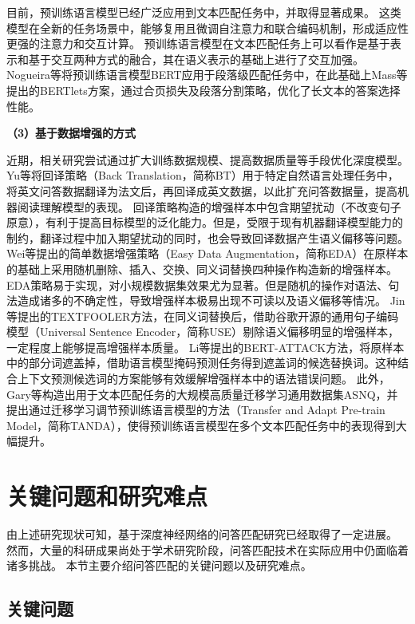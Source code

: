 目前，预训练语言模型已经广泛应用到文本匹配任务中，并取得显著成果。
这类模型在全新的任务场景中，能够复用且微调自注意力和联合编码机制，形成适应性更强的注意力和交互计算。
预训练语言模型在文本匹配任务上可以看作是基于表示和基于交互两种方式的融合，其在语义表示的基础上进行了交互加强。
Nogueira\cite{nogueira2019passage}等将预训练语言模型BERT应用于段落级匹配任务中，在此基础上Mass等提出的BERTlets\cite{mass2019study}方案，通过合页损失及段落分割策略，优化了长文本的答案选择性能。

\textbf{\songti （3）基于数据增强的方式}

近期，相关研究尝试通过扩大训练数据规模、提高数据质量等手段优化深度模型。
Yu等将回译策略（Back Translation，简称BT）\cite{yu2018qanet}用于特定自然语言处理任务中，将英文问答数据翻译为法文后，再回译成英文数据，以此扩充问答数据量，提高机器阅读理解模型的表现。
回译策略构造的增强样本中包含期望扰动（不改变句子原意），有利于提高目标模型的泛化能力。但是，受限于现有机器翻译模型能力的制约，翻译过程中加入期望扰动的同时，也会导致回译数据产生语义偏移等问题。
Wei等提出的简单数据增强策略（Easy Data Augmentation，简称EDA）\cite{wei2019eda}在原样本的基础上采用随机删除、插入、交换、同义词替换四种操作构造新的增强样本。EDA策略易于实现，对小规模数据集效果尤为显著。但是随机的操作对语法、句法造成诸多的不确定性，导致增强样本极易出现不可读以及语义偏移等情况。
Jin等提出的TEXTFOOLER\cite{jin2020bert}方法，在同义词替换后，借助谷歌开源的通用句子编码模型（Universal Sentence Encoder，简称USE）\cite{cer2018universal}剔除语义偏移明显的增强样本，一定程度上能够提高增强样本质量。
Li等提出的BERT-ATTACK\cite{li2020bert}方法，将原样本中的部分词遮盖掉，借助语言模型掩码预测任务得到遮盖词的候选替换词。这种结合上下文预测候选词的方案能够有效缓解增强样本中的语法错误问题。
此外，Gary等\cite{garg2020tanda}构造出用于文本匹配任务的大规模高质量迁移学习通用数据集ASNQ，并提出通过迁移学习调节预训练语言模型的方法（Transfer and Adapt Pre-train Model，简称TANDA），使得预训练语言模型在多个文本匹配任务中的表现得到大幅提升。


\section{关键问题和研究难点}

由上述研究现状可知，基于深度神经网络的问答匹配研究已经取得了一定进展。
然而，大量的科研成果尚处于学术研究阶段，问答匹配技术在实际应用中仍面临着诸多挑战。
本节主要介绍问答匹配的关键问题以及研究难点。

\subsection{关键问题}


